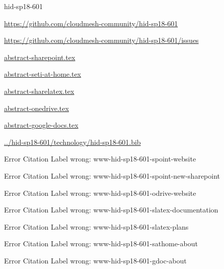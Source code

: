 \begin{IU}

hid-sp18-601

\url{https://github.com/cloudmesh-community/hid-sp18-601}

\url{https://github.com/cloudmesh-community/hid-sp18-601/issues}

\href{https://github.com/cloudmesh-community/hid-sp18-601/blob/master//technology/abstract-sharepoint.tex}{abstract-sharepoint.tex}

\href{https://github.com/cloudmesh-community/hid-sp18-601/blob/master//technology/abstract-seti-at-home.tex}{abstract-seti-at-home.tex}

\href{https://github.com/cloudmesh-community/hid-sp18-601/blob/master//technology/abstract-sharelatex.tex}{abstract-sharelatex.tex}

\href{https://github.com/cloudmesh-community/hid-sp18-601/blob/master//technology/abstract-onedrive.tex}{abstract-onedrive.tex}

\href{https://github.com/cloudmesh-community/hid-sp18-601/blob/master//technology/abstract-google-docs.tex}{abstract-google-docs.tex}

\href{https://github.com/cloudmesh-community/hid-sp18-601/blob/master//technology/hid-sp18-601.bib}{../hid-sp18-601/technology/hid-sp18-601.bib}

 Error Citation Label wrong: www-hid-sp18-601-spoint-website

 Error Citation Label wrong: www-hid-sp18-601-spoint-new-sharepoint

 Error Citation Label wrong: www-hid-sp18-601-odrive-website

 Error Citation Label wrong: www-hid-sp18-601-slatex-documentation

 Error Citation Label wrong: www-hid-sp18-601-slatex-plans

 Error Citation Label wrong: www-hid-sp18-601-sathome-about

 Error Citation Label wrong: www-hid-sp18-601-gdoc-about

\end{IU}


